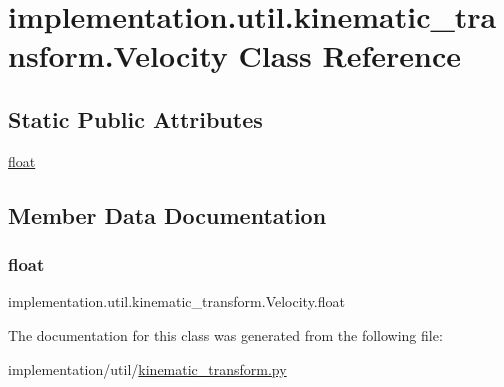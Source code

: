 \hypertarget{classimplementation_1_1util_1_1kinematic__transform_1_1_velocity}{}\section{implementation.\+util.\+kinematic\+\_\+transform.\+Velocity Class Reference}
\label{classimplementation_1_1util_1_1kinematic__transform_1_1_velocity}
\subsection*{Static Public Attributes}
\begin{DoxyCompactItemize}
\item 
\hyperlink{classimplementation_1_1util_1_1kinematic__transform_1_1_velocity_a0ee8053ff6c20f936a8a2a05738a71c9}{float}
\end{DoxyCompactItemize}


\subsection{Member Data Documentation}
\mbox{\label{classimplementation_1_1util_1_1kinematic__transform_1_1_velocity_a0ee8053ff6c20f936a8a2a05738a71c9}} 
\subsubsection{\texorpdfstring{float}{float}}
{\footnotesize\ttfamily implementation.\+util.\+kinematic\+\_\+transform.\+Velocity.\+float\hspace{0.3cm}{\ttfamily [static]}}



The documentation for this class was generated from the following file\+:\begin{DoxyCompactItemize}
\item 
implementation/util/\hyperlink{kinematic__transform_8py}{kinematic\+\_\+transform.\+py}\end{DoxyCompactItemize}
